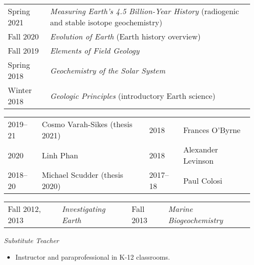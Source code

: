 \begin{tabular}{p{.15\linewidth} p{.85\linewidth}} %
	Spring 2021 & \textit{Measuring Earth’s 4.5 Billion-Year History} (radiogenic and stable isotope geochemistry)\\
	Fall 2020 & \textit{Evolution of Earth} (Earth history overview) \\
	Fall 2019 & \textit{Elements of Field Geology}\\
	Spring 2018 & \textit{Geochemistry of the Solar System}\\
	Winter 2018 & \textit{Geologic Principles} (introductory Earth science)
\end{tabular}

\begin{tabular}{ll|ll}
	2019--21 & Cosmo Varah-Sikes (thesis 2021) &
	2018 & Frances O'Byrne\\
	2020 & Linh Phan &
	2018 & Alexander Levinson \\
	2018--20 & Michael Scudder (thesis 2020) &
	2017--18 & Paul Colosi
\end{tabular}

\begin{tabular}{ll|ll} %
Fall 2012, 2013 & \textit{Investigating Earth}&
Fall 2013 & \textit{Marine Biogeochemistry}
\end{tabular}

\textit{Substitute Teacher}
\begin{itemize}
	\item Instructor and paraprofessional in K-12 classrooms.
\end{itemize}